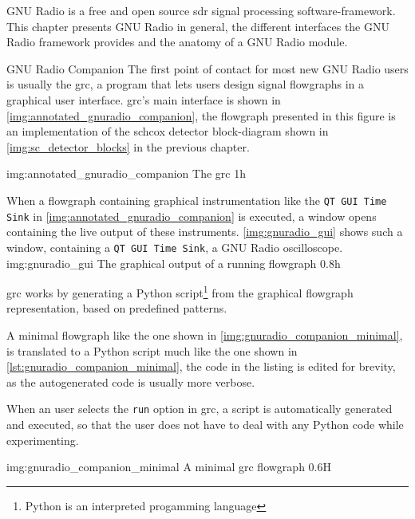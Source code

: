 GNU Radio\cite{gnuradioweb} is a free\cite{fsffreeweb} and open source
\gls{sdr} signal processing software-framework.
This chapter presents GNU Radio in general, the different interfaces
the GNU Radio framework provides and the anatomy of a GNU Radio module.

\begin{subchapter}{GNU Radio Companion}
  The first point of contact for most new GNU Radio users
  is usually the \gls{grc}, a program that lets
  users design signal flowgraphs in a graphical user interface.
  \Gls{grc}'s main interface is shown in
  \autoref{img:annotated_gnuradio_companion}, the flowgraph presented
  in this figure is an implementation of the
  \acrlong{schcox} detector block-diagram
  shown in \autoref{img:sc_detector_blocks} in the previous
  chapter.

               {img:annotated_gnuradio_companion}
               {The \acrlong{grc}}
               {1}{h}

  When a flowgraph containing graphical instrumentation like
  the \texttt{QT GUI Time Sink} in \autoref{img:annotated_gnuradio_companion}
  is executed, a window opens containing the live output of
  these instruments.
  \autoref{img:gnuradio_gui} shows such a window, containing
  a \texttt{QT GUI Time Sink}, a GNU Radio oscilloscope. \\

                  {img:gnuradio_gui}
                  {The graphical output of a running flowgraph}
                  {0.8}{h}

  \Gls{grc} works by generating a
  Python script\footnote{Python is an interpreted progamming language}
  from the
  graphical flowgraph representation, based on predefined
  patterns.

  A minimal flowgraph like the one shown in
  \autoref{img:gnuradio_companion_minimal}, is translated
  to a Python script
  much like the one shown in
  \autoref{lst:gnuradio_companion_minimal},
  the code in the listing is edited for brevity,
  as the autogenerated code is usually more verbose.

  When an user selects the \texttt{run} option in \gls{grc},
  a script is automatically generated and executed,
  so that the user does not have to deal with any Python
  code while experimenting.

                  {img:gnuradio_companion_minimal}
                  {A minimal \gls{grc} flowgraph}
                  {0.6}{H}
\end{subchapter}

